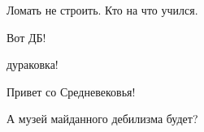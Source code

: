 \begin{itemize}
Ломать не строить. Кто на что учился. 🙁

 
Вот ДБ!

 
дураковка!

 
Привет со Средневековья!

 
А музей майданного дебилизма будет?

\end{itemize}

